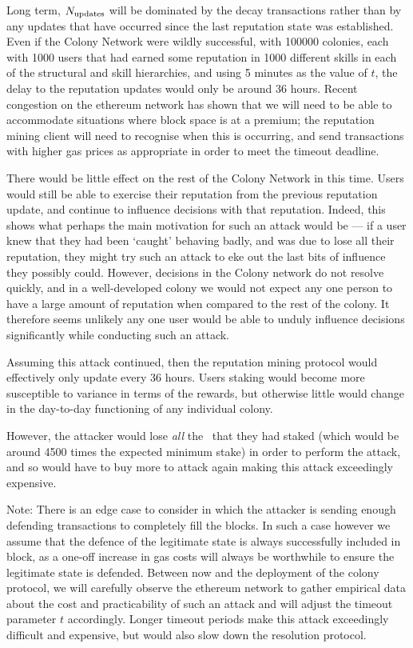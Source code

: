 Long term, $N_{\rm updates}$ will be dominated by the decay transactions rather than by any updates that have occurred since the last reputation state was established. Even if the Colony Network were wildly successful, with 100000 colonies, each with 1000 users that had earned some reputation in 1000 different skills in each of the structural and skill hierarchies, and using 5 minutes as the value of $t$, the delay to the reputation updates would only be around $36$ hours. Recent congestion on the ethereum network has shown that we will need to be able to accommodate situations where block space is at a premium; the reputation mining client will need to recognise when this is occurring, and send transactions with higher gas prices as appropriate in order to meet the timeout deadline.

There would be little effect on the rest of the Colony Network in this time. Users would still be able to exercise their reputation from the previous reputation update, and continue to influence decisions with that reputation. Indeed, this shows what perhaps the main motivation for such an attack would be --- if a user knew that they had been `caught' behaving badly, and was due to lose all their reputation, they might try such an attack to eke out the last bits of influence they possibly could. However, decisions in the Colony network do not resolve quickly, and in a well-developed colony we would not expect any one person to have a large amount of reputation when compared to the rest of the colony. It therefore seems unlikely any one user would be able to unduly influence decisions significantly while conducting such an attack.

Assuming this attack continued, then the reputation mining protocol would effectively only update every 36 hours. Users staking would become more susceptible to variance in terms of the rewards, but otherwise little would change in the day-to-day functioning of any individual colony. 

However, the attacker would lose \emph{all} the \rct\ that they had staked (which would be around 4500 times the expected minimum stake) in order to perform the attack, and so would have to buy more to attack again making this attack exceedingly expensive.


Note: There is an edge case to consider in which the attacker is sending enough defending transactions to completely fill the blocks. In such a case however we assume that the defence of the legitimate state is always successfully included in block, as a one-off increase in gas costs will always be worthwhile to ensure the legitimate state is defended. Between now and the deployment of the colony protocol, we will carefully observe the ethereum network to gather empirical data about the cost and practicability of such an attack and will adjust the timeout parameter $t$ accordingly. Longer timeout periods make this attack exceedingly difficult and expensive, but would also slow down the resolution protocol.

